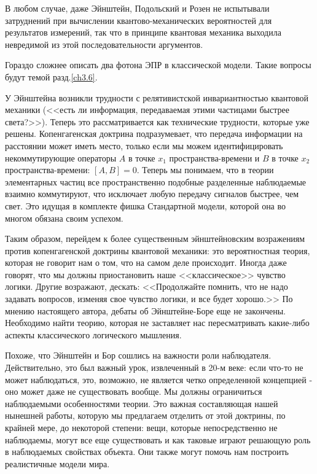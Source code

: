 \documentclass[main.tex]{subfiles}
\begin{document}
В любом случае, даже Эйнштейн, Подольский и Розен не испытывали затруднений при вычислении квантово-механических вероятностей для результатов измерений, так что в принципе квантовая механика выходила невредимой из этой последовательности аргументов.

Гораздо сложнее описать два фотона ЭПР в классической модели. Такие вопросы будут темой разд.\ref{ch3.6}.

У Эйнштейна возникли трудности с релятивистской инвариантностью квантовой механики (<<есть ли информация, передаваемая этими частицами быстрее света?>>). Теперь это рассматривается как технические трудности, которые уже решены. Копенгагенская доктрина подразумевает, что передача информации на расстоянии может иметь место, только если мы можем идентифицировать некоммутирующие операторы $A$ в точке $x_1$ пространства-времени и $B$ в точке $x_2$ пространства-времени: $[A, B] = 0$. Теперь мы понимаем, что в теории элементарных частиц все пространственно подобные разделенные наблюдаемые взаимно коммутируют, что исключает любую передачу сигналов быстрее, чем свет. Это идущая в комплекте фишка Стандартной модели, которой она во многом обязана своим успехом.

Таким образом, перейдем к более существенным эйнштейновским возражениям против копенгагенской доктрины квантовой механики: это вероятностная теория, которая не говорит нам о том, что на самом деле происходит. Иногда даже говорят, что мы должны приостановить наше <<классическое>> чувство логики. Другие возражают, дескать: <<Продолжайте помнить, что не надо задавать вопросов, изменяя свое чувство логики, и все будет хорошо.>> По мнению настоящего автора, дебаты об Эйнштейне-Боре еще не закончены. Необходимо найти теорию, которая не заставляет нас пересматривать какие-либо аспекты классического логического мышления.

Похоже, что Эйнштейн и Бор сошлись на важности роли наблюдателя. Действительно, это был важный урок, извлеченный в 20-м веке: если что-то не может наблюдаться, это, возможно, не является четко определенной концепцией - оно может даже не существовать вообще. Мы должны ограничиться наблюдаемыми особенностями теории. Это важная составляющая нашей нынешней работы, которую мы предлагаем отделить от этой доктрины, по крайней мере, до некоторой степени: вещи, которые непосредственно не наблюдаемы, могут все еще существовать и как таковые играют решающую роль в наблюдаемых свойствах объекта. Они также могут помочь нам построить реалистичные модели мира.
\end{document}
